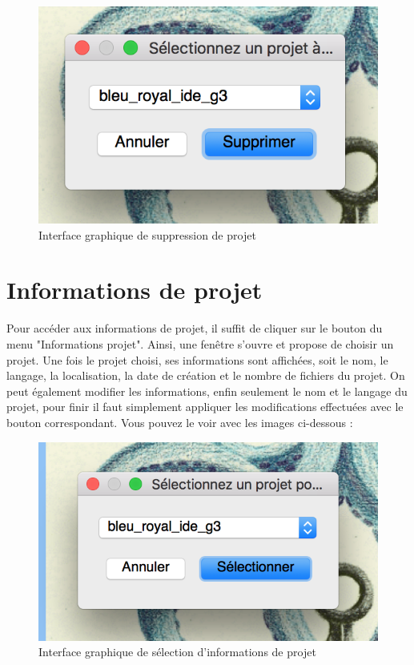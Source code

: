 \documentclass[a4paper,12pt]{article}
\begin{document}
\begin{figure}[h!]
			\begin{center}
				\includegraphics[scale=0.5]{images/supp_project.png}
				\caption{Interface graphique de suppression de projet}
			\end{center}
		\end{figure}

\section{Informations de projet}

Pour accéder aux informations de projet, il suffit de cliquer sur le bouton du menu "Informations projet". Ainsi, une fenêtre s'ouvre et propose de choisir un projet. Une fois le projet choisi, ses informations sont affichées, soit le nom, le langage, la localisation, la date de création et le nombre de fichiers du projet. On peut également modifier les informations, enfin seulement le nom et le langage du projet, pour finir il faut simplement appliquer les modifications effectuées avec le bouton correspondant. Vous pouvez le voir avec les images ci-dessous :

\begin{figure}[h!]
			\begin{center}
				\includegraphics[scale=0.5]{images/info_project1.png}
				\caption{Interface graphique de sélection d'informations de projet}
			\end{center}
		\end{figure}
		
\end{document}
